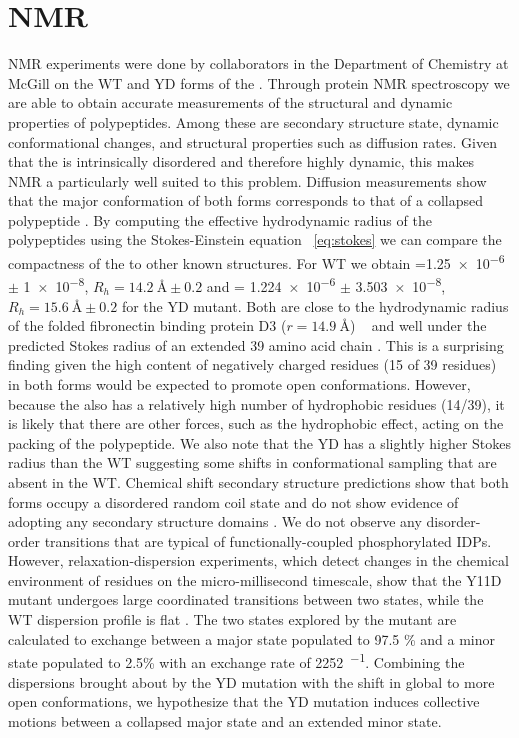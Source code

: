 \section{NMR}

NMR experiments were done by collaborators in the Department of Chemistry at McGill on the WT and YD forms of the \gct. Through protein NMR spectroscopy we are able to obtain accurate \vitro measurements of the structural and dynamic properties of polypeptides. Among these are secondary structure state, dynamic conformational changes, and structural properties such as diffusion rates. Given that the \gct is intrinsically disordered and therefore highly dynamic, this makes NMR a particularly well suited to this problem. Diffusion measurements show that the major conformation of both forms corresponds to that of a collapsed polypeptide . By computing the effective hydrodynamic radius of the polypeptides using the Stokes-Einstein equation ~\ref{eq:stokes} we can compare the compactness of the \gct to other known structures. For WT we obtain \diffusion=\num{1.25e-6} $\pm$  \SI{1e-8}{\dcunits}, $R_h = \SI{14.2}{\angstrom} \pm 0.2$ and \diffusion= \num{1.224e-6} $\pm$ \SI{3.503e-8}{\dcunits}, $R_h = \SI{15.6}{\angstrom} \pm 0.2$ for the YD mutant. Both are close to the hydrodynamic radius of the folded fibronectin binding protein D3 ($r = \SI{14.9}{\angstrom}$) ~\cite{wilkins1999hydrodynamic} and well under the predicted Stokes radius of an extended 39 amino acid chain . This is a surprising finding given the high content of negatively charged residues (15 of 39 residues) in both forms would be expected to promote open conformations. However, because the \gct also has a relatively high number of hydrophobic residues (14/39), it is likely that there are other forces, such as the hydrophobic effect, acting on the packing of the polypeptide. We also note that the YD has a slightly higher Stokes radius than the WT suggesting some shifts in conformational sampling that are absent in the WT. Chemical shift secondary structure predictions show that both forms occupy a disordered random coil state and do not show evidence of adopting any secondary structure domains . We do not observe any disorder-order transitions that are typical of functionally-coupled phosphorylated IDPs. However, relaxation-dispersion experiments, which detect changes in the chemical environment of residues on the micro-millisecond timescale, show that the Y11D mutant undergoes large coordinated transitions between two states, while the WT dispersion profile is flat . The two states explored by the mutant are calculated to exchange between a major state populated to 97.5 \% and a minor state populated to 2.5\% with an exchange rate of \SI{2252}{\sec^{-1}}. Combining the dispersions brought about by the YD mutation with the shift in global \diffusion to more open conformations, we hypothesize that the YD mutation induces collective motions between a collapsed major state and an extended minor state. 

